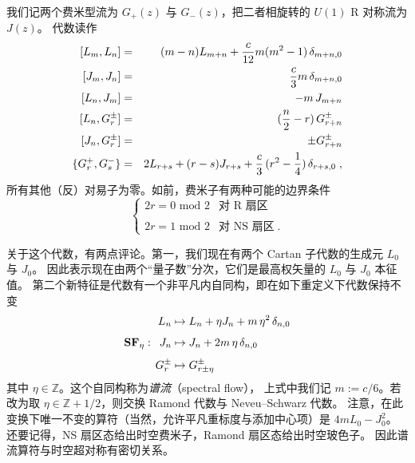 \documentclass[11pt,a4paper,fontset=windows]{ctexart}
\numberwithin{equation}{section}
\newcommand{\Z}{\mathbb{Z}}
\def\d{\delta}
\newcommand{\bea}{\begin{eqnarray}}
\newcommand{\eea}{\end{eqnarray}}
\newcommand{\be}{\begin{equation}}
\newcommand{\ee}{\end{equation}}
\begin{document}
我们记两个费米型流为 $G_+(z)$ 与 $G_-(z)$，把二者相旋转的 $U(1)$ R 对称流为 $J(z)$。
代数读作
\bea\notag
\lbrack L_m,L_n\rbrack&=& (m-n) L_{m+n} + \frac{c}{12} m (m^2-1) \,\d_{m+n,0}\\ \notag
\lbrack J_m,J_n \rbrack&=&\frac{c}{3} m \,\d_{m+n,0}\\ \notag
\lbrack L_n,J_m \rbrack &=& -m \,J_{m+n}\\ \label{n_2_superconformal_algebra}
\lbrack L_n,G_r^{\pm} \rbrack &=& (\frac{n}{2} - r)\, G_{r+n}^\pm\\ \notag
\lbrack J_n,G_r^{\pm} \rbrack &=&\pm G_{r+n}^{\pm} \\ \notag
\{G^{+}_{r},G^-_{s}\} &=& 2 L_{r+s} + (r-s) J_{r+s} +\frac{c}{3}\, (r^2 -\frac{1}{4})\, \d_{r+s,0}\;,
\eea
所有其他（反）对易子为零。如前，费米子有两种可能的边界条件
\be
\begin{cases}
2r =  0 \text{  mod   }2 &\text{对 R 扇区} \\ &\\ 
2r = 1 \text{  mod   }2 &\text{对 NS 扇区}\;.
\end{cases} 
\ee


关于这个代数，有两点评论。第一，我们现在有两个 Cartan 子代数的生成元 $L_0$ 与 $J_0$。
因此表示现在由两个“量子数”分次，它们是最高权矢量的 $L_0$ 与 $J_0$ 本征值。
第二个新特征是代数有一个非平凡内自同构，即在如下重定义下代数保持不变
\begin{align} \notag
L_n &\mapsto L_n + \eta J_n + m\, \eta^2 \,\d_{n,0}\\[4pt]
{\bf SF}_\eta :\hspace{5pt} J_n&\mapsto J_n + 2m\,  \eta \, \d_{n,0}\\[4pt] \notag
G_r^\pm &\mapsto G_{r\pm\eta}^\pm\;
\end{align}
其中 $\eta \in \Z$。这个自同构称为\emph{谱流}（spectral flow），
上式中我们记 $m:= c/6$。若改为取 $\eta\in \Z+1/2$，则交换 Ramond 代数与 Neveu–Schwarz 代数。
注意，在此变换下唯一不变的算符（当然，允许平凡重标度与添加中心项）是 $4mL_0 -J_0^2$。
还要记得，NS 扇区态给出时空费米子，Ramond 扇区态给出时空玻色子。
因此谱流算符与时空超对称有密切关系。

\end{document}
